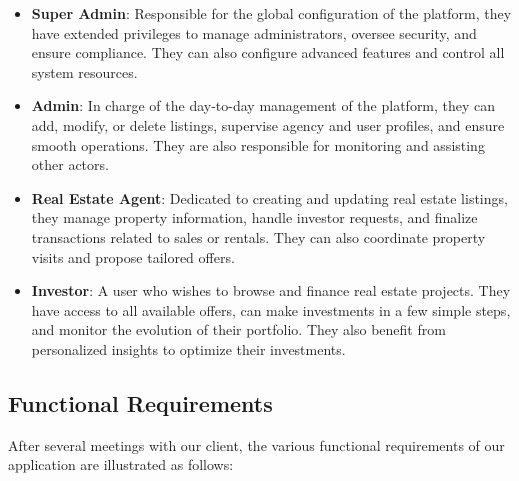 \begin{itemize}
    \item \textbf{\textcolor{primary}{Super Admin}}: Responsible for the global configuration of the platform, they have extended privileges to manage administrators, oversee security, and ensure compliance. They can also configure advanced features and control all system resources.
    
    \item \textbf{\textcolor{primary}{Admin}}: In charge of the day-to-day management of the platform, they can add, modify, or delete listings, supervise agency and user profiles, and ensure smooth operations. They are also responsible for monitoring and assisting other actors.
    
    \item \textbf{\textcolor{primary}{Real Estate Agent}}: Dedicated to creating and updating real estate listings, they manage property information, handle investor requests, and finalize transactions related to sales or rentals. They can also coordinate property visits and propose tailored offers.
    
    \item \textbf{\textcolor{primary}{Investor}}: A user who wishes to browse and finance real estate projects. They have access to all available offers, can make investments in a few simple steps, and monitor the evolution of their portfolio. They also benefit from personalized insights to optimize their investments.
\end{itemize} 

\subsection{Functional Requirements}

After several meetings with our client, the various functional requirements of our application are illustrated as follows:

